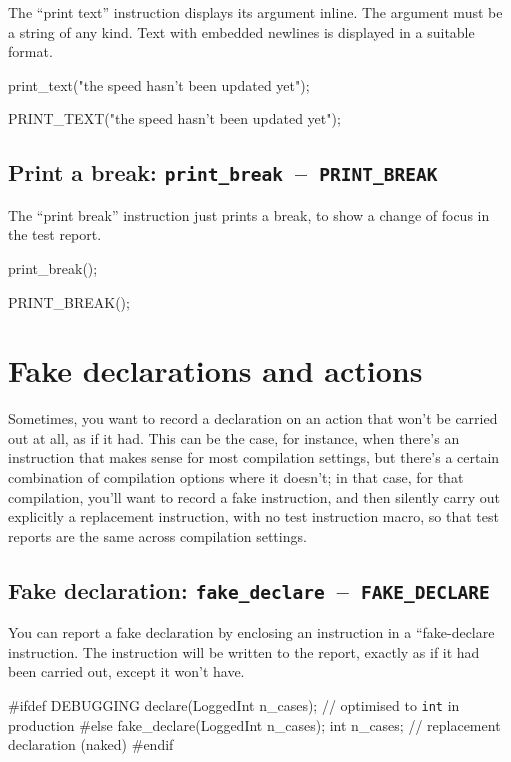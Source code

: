 \documentclass[twoside, a4paper, article]{memoir}
\newcommand*\testudocolor{\color{red!80!blue}}
\newcommand*\testudo[1]{\texttt{\testudocolor{}#1}}
\newcommand*\testudopair[2]{\testudo{#1}~--~\testudo{#2}}
\newcommand\subsectiontestudopair[3]{%
  \subsection[#1]{#1: \testudopair{#2}{#3}}}
\begin{document}
The ``print text'' instruction displays its argument inline.  The argument must
be a string of any kind.  Text with embedded newlines is displayed in a
suitable format.

\begin{cpplisting}
print_text("the speed hasn't been updated yet");
\end{cpplisting}

\begin{cpplisting}
PRINT_TEXT("the speed hasn't been updated yet");
\end{cpplisting}


\subsectiontestudopair{Print a break}{print\_break}{PRINT\_BREAK}
\label{sec:print-break}

The ``print break'' instruction just prints a break, to show a change of focus
in the test report.

\begin{cpplisting}
print_break();
\end{cpplisting}

\begin{cpplisting}
PRINT_BREAK();
\end{cpplisting}


\section{Fake declarations and actions}
\label{sec:fake-declarations-actions}

Sometimes, you want to record a declaration on an action that won't be carried
out at all, as if it had.  This can be the case, for instance, when there's an
instruction that makes sense for most compilation settings, but there's a
certain combination of compilation options where it doesn't; in that case, for
that compilation, you'll want to record a fake instruction, and then silently
carry out explicitly a replacement instruction, with no test instruction macro,
so that test reports are the same across compilation settings.

\subsectiontestudopair{Fake declaration}{fake\_declare}{FAKE\_DECLARE}
\label{sec:fake-action}

You can report a fake declaration by enclosing an instruction in a
``fake-declare instruction.  The instruction will be written to the report,
exactly as if it had been carried out, except it won't have.
\begin{cpplisting}
#ifdef DEBUGGING
declare(LoggedInt n_cases); // optimised to \texttt{int} in production
#else
fake_declare(LoggedInt n_cases);
int n_cases; // replacement declaration (naked)
#endif
\end{cpplisting}
\end{document}
